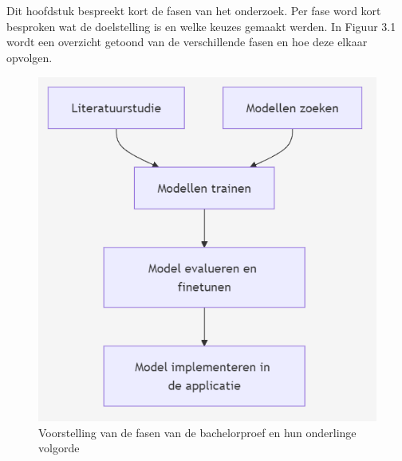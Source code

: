 
\chapter{}%
\label{ch:methodologie}


Dit hoofdstuk bespreekt kort de fasen van het onderzoek. Per fase word kort besproken wat de doelstelling is en welke keuzes gemaakt werden. In Figuur 3.1 wordt een overzicht getoond van de verschillende fasen en hoe deze elkaar opvolgen.
\begin{figure}
	\centering
	\includegraphics[width=\columnwidth]{./img/verloop.png}
	\caption{Voorstelling van de fasen van de bachelorproef en hun onderlinge volgorde}
\end{figure}


